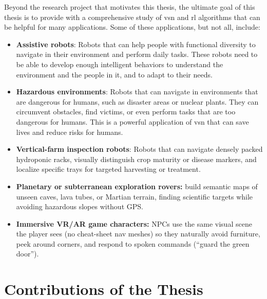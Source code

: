 Beyond the research project that motivates this thesis, the ultimate goal of this thesis is to provide with a comprehensive study of \acrshort{vsn} and \acrshort{rl} algorithms that can be helpful for many applications.
Some of these applications, but not all, include:
\begin{itemize}
    \item \textbf{Assistive robots}: Robots that can help people with functional diversity to navigate in their environment and perform daily tasks.
    These robots need to be able to develop enough intelligent behaviors to understand the environment and the people in it, and to adapt to their needs.
    \item \textbf{Hazardous environments}: Robots that can navigate in environments that are dangerous for humans, such as disaster areas or nuclear plants.
    They can circumvent obstacles, find victims, or even perform tasks that are too dangerous for humans.
    This is a powerful application of \acrshort{vsn} that can save lives and reduce risks for humans.
    \item \textbf{Vertical-farm inspection robots}: Robots that can navigate densely packed hydroponic racks, visually distinguish crop maturity or disease markers, and localize specific trays for targeted harvesting or treatment.
    \item \textbf{Planetary or subterranean exploration rovers:} build semantic maps of unseen caves, lava tubes, or Martian terrain, finding scientific targets while avoiding hazardous slopes without GPS.
    \item \textbf{Immersive VR/AR game characters:} NPCs use the same visual scene the player sees (no cheat-sheet nav meshes) so they naturally avoid furniture, peek around corners, and respond to spoken commands (“guard the green door”).
\end{itemize}

\section{Contributions of the Thesis}\label{sec:contributions-of-the-thesis}

